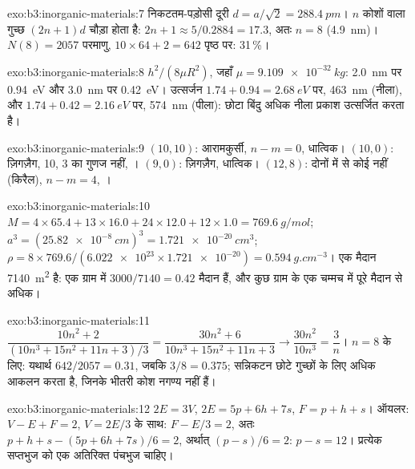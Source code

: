 \begin{solution}{exo:b3:inorganic-materials:7}
निकटतम-पड़ोसी दूरी $d = a/\sqrt2 = \qty{288.4}{pm}$। $n$ कोशों वाला गुच्छ $(2n + 1)d$ चौड़ा होता है:
$2n + 1 \approx 5/0.2884 = 17.3$, अतः $n = 8$ (\qty{4.9}{nm})। $N(8) = 2057$ परमाणु, $10 \times 64 + 2 = 642$ पृष्ठ पर:
31\,\%।
\end{solution}

\begin{solution}{exo:b3:inorganic-materials:8}
$h^2/(8\mu R^2)$, जहाँ $\mu = \qty{9.109e-32}{kg}$: \qty{2.0}{nm} पर \qty{0.94}{eV} और \qty{3.0}{nm} पर \qty{0.42}{eV}। उत्सर्जन
$1.74 + 0.94 = \qty{2.68}{eV}$ पर, \qty{463}{nm} (नीला), और $1.74 + 0.42 = \qty{2.16}{eV}$ पर, \qty{574}{nm} (पीला): छोटा बिंदु
अधिक नीला प्रकाश उत्सर्जित करता है।
\end{solution}

\begin{solution}{exo:b3:inorganic-materials:9}
$(10, 10)$: आरामकुर्सी, $n - m = 0$, धात्विक। $(10, 0)$: ज़िगज़ैग, 10, 3 का गुणज नहीं, ।
$(9, 0)$: ज़िगज़ैग, धात्विक। $(12, 8)$: दोनों में से कोई नहीं (किरैल), $n - m = 4$, ।
\end{solution}

\begin{solution}{exo:b3:inorganic-materials:10}
$M = 4 \times 65.4 + 13 \times 16.0 + 24 \times 12.0 + 12 \times 1.0 = \qty{769.6}{g/mol}$; $a^3 = (\qty{25.82e-8}{cm})^3 = \qty{1.721e-20}{cm^3}$;
$\rho = 8 \times 769.6/(\num{6.022e23} \times \num{1.721e-20}) = \qty{0.594}{g.cm^{-3}}$। एक मैदान \qty{7140}{m^2} है: एक ग्राम में
$3000/7140 = 0.42$ मैदान हैं, और कुछ ग्राम के एक चम्मच में पूरे मैदान से अधिक।
\end{solution}

\begin{solution}{exo:b3:inorganic-materials:11}
$\dfrac{10n^2 + 2}{(10n^3 + 15n^2 + 11n + 3)/3} = \dfrac{30n^2 + 6}{10n^3 + 15n^2 + 11n + 3} \to \dfrac{30n^2}{10n^3} = \dfrac3n$। $n = 8$ के लिए: यथार्थ
$642/2057 = 0.31$, जबकि $3/8 = 0.375$; सन्निकटन छोटे गुच्छों के लिए अधिक आकलन करता है,
जिनके भीतरी कोश नगण्य नहीं हैं।
\end{solution}

\begin{solution}{exo:b3:inorganic-materials:12}
$2E = 3V$, $2E = 5p + 6h + 7s$, $F = p + h + s$। ऑयलर: $V - E + F = 2$, $V = 2E/3$ के साथ: $F - E/3 = 2$, अतः
$p + h + s - (5p + 6h + 7s)/6 = 2$, अर्थात् $(p - s)/6 = 2$: $p - s = 12$। प्रत्येक सप्तभुज को एक अतिरिक्त
पंचभुज चाहिए।
\end{solution}

